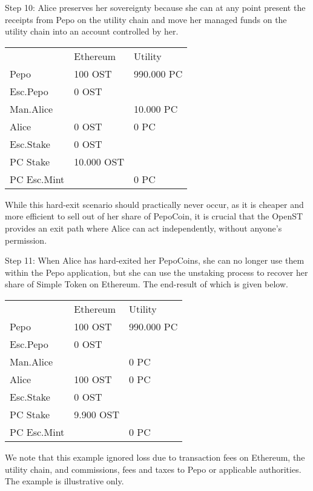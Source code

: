 \documentclass[12pt,a4paper, twocolumn]{article}
\begin{document}
Step 10: Alice preserves her sovereignty because she can at any point present the receipts from Pepo on the utility chain and move her managed funds on the utility chain into an account controlled by her.
\begin{table}[H]
\centering
\label{Step-10}
\begin{tabular}{lll}
    & Ethereum    &   Utility   \\
Pepo        & 100 OST    & 990.000 PC \\
Esc.Pepo    & 0 OST      &            \\
Man.Alice   &            & 10.000 PC  \\
Alice       & 0 OST      & 0 PC       \\
Esc.Stake   & 0 OST      &            \\
PC Stake    & 10.000 OST &            \\
PC Esc.Mint &            & 0 PC   
\end{tabular}
\end{table} 
While this hard-exit scenario should practically never occur, as it is cheaper and more efficient to sell out of her share of PepoCoin, it is crucial that the OpenST provides an exit path where Alice can act independently, without anyone’s permission.\par

Step 11: When Alice has hard-exited her PepoCoins, she can no longer use them within the Pepo application, but she can use the unstaking process to recover her share of Simple Token on Ethereum.  The end-result of which is given below.
\begin{table}[H]
\centering
\label{Step-11}
\begin{tabular}{lll}
    & Ethereum    &   Utility   \\
Pepo        & 100 OST   & 990.000 PC \\
Esc.Pepo    & 0 OST     &            \\
Man.Alice   &           & 0 PC       \\
Alice       & 100 OST   & 0 PC       \\
Esc.Stake   & 0 OST     &            \\
PC Stake    & 9.900 OST &            \\
PC Esc.Mint &           & 0 PC  
\end{tabular}
\end{table} 
We note that this example ignored loss due to transaction fees on Ethereum, the utility chain, and commissions, fees and taxes to Pepo or applicable authorities.  The example is illustrative only.
\end{document}
